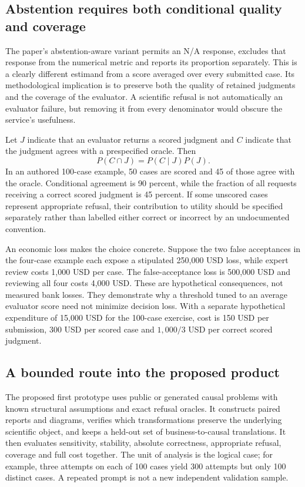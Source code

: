 \subsection{Abstention requires both conditional quality and coverage}

The paper's abstention-aware variant permits an N/A response, excludes that
response from the numerical metric and reports its proportion separately.
This is a clearly different estimand from a score averaged over every
submitted case. Its methodological implication is to preserve both the
quality of retained judgments and the coverage of the evaluator.
A scientific refusal is not automatically an evaluator failure, but
removing it from every denominator would obscure the service's usefulness.
\citep{exec24_judgebias_original}

Let $J$ indicate that an evaluator returns a scored judgment and $C$ indicate
that the judgment agrees with a prespecified oracle. Then
\[
 P(C\cap J)=P(C\mid J)P(J).
\]
In an authored 100-case example, 50 cases are scored and 45 of those agree
with the oracle. Conditional agreement is 90 percent, while the fraction
of all requests receiving a correct scored judgment is 45 percent. If
some unscored cases represent appropriate refusal, their contribution to
utility should be specified separately rather than labelled either correct
or incorrect by an undocumented convention.
\citep{exec24_judgebias_reference}

An economic loss makes the choice concrete. Suppose the two false
acceptances in the four-case example each expose a stipulated 250,000 USD
loss, while expert review costs 1,000 USD per case. The false-acceptance
loss is 500,000 USD and reviewing all four costs 4,000 USD. These are
hypothetical consequences, not measured bank losses. They demonstrate why
a threshold tuned to an average evaluator score need not minimize decision
loss. With a separate hypothetical expenditure of 15,000 USD for the
100-case exercise, cost is 150 USD per submission, 300 USD per scored case
and $1{,}000/3$ USD per correct scored judgment.
\citep{exec24_judgebias_reference}

\subsection{A bounded route into the proposed product}

The proposed first prototype uses public or generated causal problems with
known structural assumptions and exact refusal oracles. It constructs
paired reports and diagrams, verifies which transformations preserve the
underlying scientific object, and keeps a held-out set of business-to-causal
translations. It then evaluates sensitivity, stability, absolute correctness,
appropriate refusal, coverage and full cost together. The unit of analysis
is the logical case; for example, three attempts on each of 100 cases yield
300 attempts but only 100 distinct cases. A repeated prompt is not a new
independent validation sample.~\citep{exec24_judgebias_reference}

